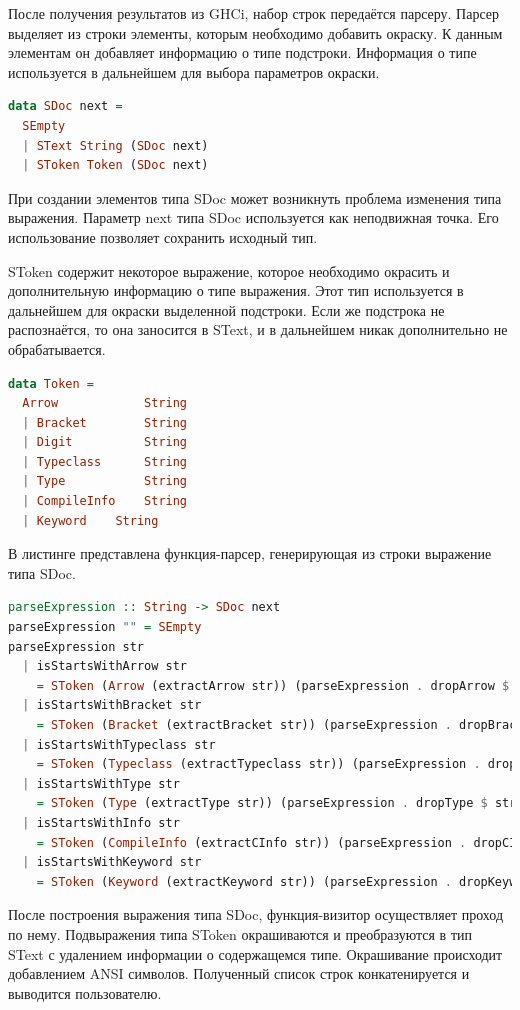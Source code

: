 После получения результатов из GHCi, набор строк передаётся парсеру. Парсер выделяет из строки элементы, которым необходимо добавить окраску. К данным элементам он добавляет информацию о типе подстроки. Информация о типе используется в дальнейшем для выбора параметров окраски.

\begin{lstlisting}[language=Haskell]
data SDoc next =
  SEmpty
  | SText String (SDoc next)
  | SToken Token (SDoc next)
\end{lstlisting}

При создании элементов типа SDoc может возникнуть проблема изменения типа выражения. Параметр next типа SDoc используется как неподвижная точка. Его использование позволяет сохранить исходный тип.

SToken содержит некоторое выражение, которое необходимо окрасить и дополнительную информацию о типе выражения. Этот тип используется в дальнейшем для окраски выделенной подстроки. Если же подстрока не распознаётся, то она заносится в SText, и в дальнейшем никак дополнительно не обрабатывается.

\begin{lstlisting}[language=Haskell]
data Token =
  Arrow            String
  | Bracket        String
  | Digit          String
  | Typeclass      String
  | Type           String
  | CompileInfo    String 
  | Keyword	   String
\end{lstlisting}

В листинге представлена функция-парсер, генерирующая из строки выражение типа SDoc.

\begin{lstlisting}[language=Haskell, caption = Функция парсинга выражения]
parseExpression :: String -> SDoc next
parseExpression "" = SEmpty
parseExpression str
  | isStartsWithArrow str
    = SToken (Arrow (extractArrow str)) (parseExpression . dropArrow $ str)
  | isStartsWithBracket str
    = SToken (Bracket (extractBracket str)) (parseExpression . dropBracket $ str)
  | isStartsWithTypeclass str
    = SToken (Typeclass (extractTypeclass str)) (parseExpression . dropTypeclass $ str)
  | isStartsWithType str
    = SToken (Type (extractType str)) (parseExpression . dropType $ str)
  | isStartsWithInfo str
    = SToken (CompileInfo (extractCInfo str)) (parseExpression . dropCInfo $ str)
  | isStartsWithKeyword str
    = SToken (Keyword (extractKeyword str)) (parseExpression . dropKeyword $ str)
\end{lstlisting}

После построения выражения типа SDoc, функция-визитор осуществляет проход по нему. Подвыражения типа SToken окрашиваются и преобразуются в тип SText с удалением информации о содержащемся типе. Окрашивание происходит добавлением ANSI символов. Полученный список строк конкатенируется и выводится пользователю.

